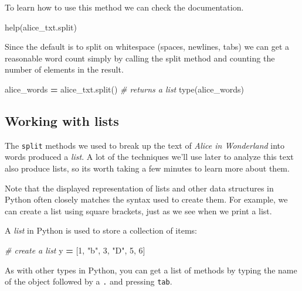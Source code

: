 \documentclass[]{book}
\newenvironment{Shaded}{\begin{snugshade}}{\end{snugshade}}
\newcommand{\DecValTok}[1]{\textcolor[rgb]{0.00,0.00,0.81}{#1}}
\newcommand{\StringTok}[1]{\textcolor[rgb]{0.31,0.60,0.02}{#1}}
\newcommand{\CommentTok}[1]{\textcolor[rgb]{0.56,0.35,0.01}{\textit{#1}}}
\newcommand{\OperatorTok}[1]{\textcolor[rgb]{0.81,0.36,0.00}{\textbf{#1}}}
\newcommand{\BuiltInTok}[1]{#1}
\newcommand{\NormalTok}[1]{#1}
\begin{document}
To learn how to use this method we can check the documentation.

\begin{Shaded}
\begin{Highlighting}[]
\BuiltInTok{help}\NormalTok{(alice_txt.split)}
\end{Highlighting}
\end{Shaded}

Since the default is to split on whitespace (spaces, newlines, tabs) we
can get a reasonable word count simply by calling the split method and
counting the number of elements in the result.

\begin{Shaded}
\begin{Highlighting}[]
\NormalTok{alice_words }\OperatorTok{=}\NormalTok{ alice_txt.split() }\CommentTok{# returns a list}
\BuiltInTok{type}\NormalTok{(alice_words)}
\end{Highlighting}
\end{Shaded}

\subsection{Working with lists}\label{working-with-lists}

The \texttt{split} methods we used to break up the text of \emph{Alice
in Wonderland} into words produced a \emph{list}. A lot of the
techniques we'll use later to analyze this text also produce lists, so
its worth taking a few minutes to learn more about them.

Note that the displayed representation of lists and other data
structures in Python often closely matches the syntax used to create
them. For example, we can create a list using square brackets, just as
we see when we print a list.

A \emph{list} in Python is used to store a collection of items:

\begin{Shaded}
\begin{Highlighting}[]
\CommentTok{# create a list}
\NormalTok{y }\OperatorTok{=}\NormalTok{ [}\DecValTok{1}\NormalTok{, }\StringTok{"b"}\NormalTok{, }\DecValTok{3}\NormalTok{, }\StringTok{"D"}\NormalTok{, }\DecValTok{5}\NormalTok{, }\DecValTok{6}\NormalTok{]}
\end{Highlighting}
\end{Shaded}

As with other types in Python, you can get a list of methods by typing
the name of the object followed by a \texttt{.} and pressing
\texttt{tab}.
\end{document}
